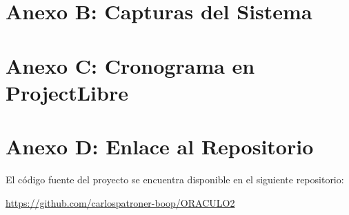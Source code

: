 \documentclass[conference]{IEEEtran}
\begin{document}

\section{Anexo B: Capturas del Sistema}



\section{Anexo C: Cronograma en ProjectLibre}


\section{Anexo D: Enlace al Repositorio}

El código fuente del proyecto se encuentra disponible en el siguiente repositorio:

\url{https://github.com/carlospatroner-boop/ORACULO2}
\end{document}
